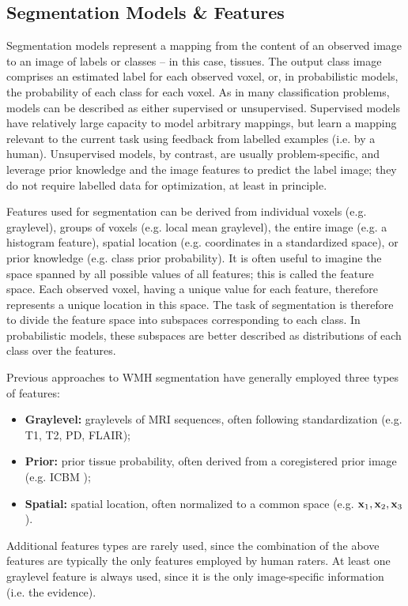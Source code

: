 \subsection{Segmentation Models \& Features}
Segmentation models represent a mapping from the content of an observed image to an image of labels or classes -- in this case, tissues. The output class image comprises an estimated label for each observed voxel, or, in probabilistic models, the probability of each class for each voxel. As in many classification problems, models can be described as either supervised or unsupervised. Supervised models have relatively large capacity to model arbitrary mappings, but learn a mapping relevant to the current task using feedback from labelled examples (i.e. by a human). Unsupervised models, by contrast, are usually problem-specific, and leverage prior knowledge and the image features to predict the label image; they do not require labelled data for optimization, at least in principle. 
\par
Features used for segmentation can be derived from individual voxels (e.g. graylevel), groups of voxels (e.g. local mean graylevel), the entire image (e.g. a histogram feature), spatial location (e.g. coordinates in a standardized space), or prior knowledge (e.g. class prior probability). It is often useful to imagine the space spanned by all possible values of all features; this is called the feature space. Each observed voxel, having a unique value for each feature, therefore represents a unique location in this space. The task of segmentation is therefore to divide the feature space into subspaces corresponding to each class. In probabilistic models, these subspaces are better described as distributions of each class over the features.
\par
Previous approaches to WMH segmentation have generally employed three types of features:
\begin{itemize}
  \item \textbf{Graylevel:} graylevels of MRI sequences, often following standardization (e.g. T1, T2, PD, FLAIR);
  \item \textbf{Prior:} prior tissue probability, often derived from a coregistered prior image (e.g. ICBM \cite{Mazziotta2001});
  \item \textbf{Spatial:} spatial location, often normalized to a common space (e.g. $\mathbf{x}_1, \mathbf{x}_2, \mathbf{x}_3$).
\end{itemize}
Additional features types are rarely used, since the combination of the above features are typically the only features employed by human raters. At least one graylevel feature is always used, since it is the only image-specific information (i.e. the evidence).
